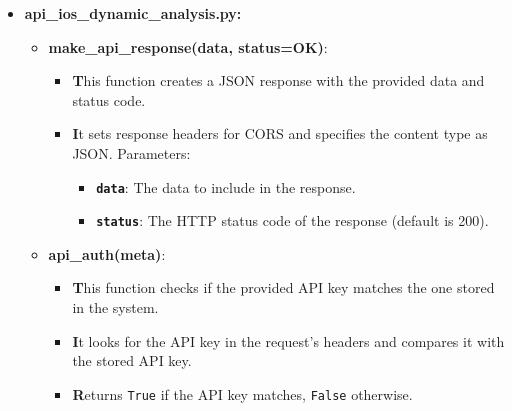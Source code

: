 \documentclass{report}
\begin{document}
\begin{itemize}
\begin{itemize}
\begin{itemize}
                \end{itemize}

            \item \textbf{api\_ios\_dynamic\_analysis.py:}
                \begin{itemize}
                    \item \textbf{make\_api\_response(data, status=OK)}:
                        \begin{itemize}
                            \item \textbf This function creates a JSON response with the provided data and status code.
                            \item \textbf It sets response headers for CORS and specifies the content type as JSON.
                            Parameters:
                                \begin{itemize}
                                    \item \textbf \texttt{data}: The data to include in the response.
                                    \item \textbf \texttt{status}: The HTTP status code of the response (default is 200).
                                \end{itemize}
                        \end{itemize}
                    
                    \item \textbf{api\_auth(meta)}:
                        \begin{itemize}
                            \item \textbf This function checks if the provided API key matches the one stored in the system.
                            \item \textbf It looks for the API key in the request's headers and compares it with the stored API key.
                            \item \textbf Returns \texttt{True} if the API key matches, \texttt{False} otherwise.
                        \end{itemize}
                    

\end{itemize}
\end{itemize}
\end{itemize}
\end{document}
